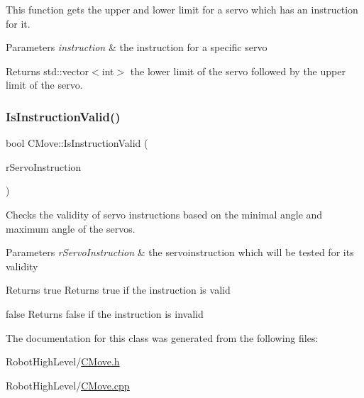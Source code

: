 This function gets the upper and lower limit for a servo which has an instruction for it. 


\begin{DoxyParams}{Parameters}
{\em instruction} & the instruction for a specific servo \\
\hline
\end{DoxyParams}
\begin{DoxyReturn}{Returns}
std\+::vector$<$int$>$ the lower limit of the servo followed by the upper limit of the servo. 
\end{DoxyReturn}
\mbox{\label{classCMove_a42a503487eb0aeed688fad00e18c8071}} 
\subsubsection{\texorpdfstring{Is\+Instruction\+Valid()}{IsInstructionValid()}}
{\footnotesize\ttfamily bool C\+Move\+::\+Is\+Instruction\+Valid (\begin{DoxyParamCaption}\item[{std\+::shared\+\_\+ptr$<$ \hyperlink{classCServoInstruction}{C\+Servo\+Instruction} $>$}]{r\+Servo\+Instruction }\end{DoxyParamCaption})}



Checks the validity of servo instructions based on the minimal angle and maximum angle of the servo\textquotesingle{}s. 


\begin{DoxyParams}{Parameters}
{\em r\+Servo\+Instruction} & the servoinstruction which will be tested for it\textquotesingle{}s validity \\
\hline
\end{DoxyParams}
\begin{DoxyReturn}{Returns}
true Returns true if the instruction is valid 

false Returns false if the instruction is invalid 
\end{DoxyReturn}


The documentation for this class was generated from the following files\+:\begin{DoxyCompactItemize}
\item 
Robot\+High\+Level/\hyperlink{CMove_8h}{C\+Move.\+h}\item 
Robot\+High\+Level/\hyperlink{CMove_8cpp}{C\+Move.\+cpp}\end{DoxyCompactItemize}
